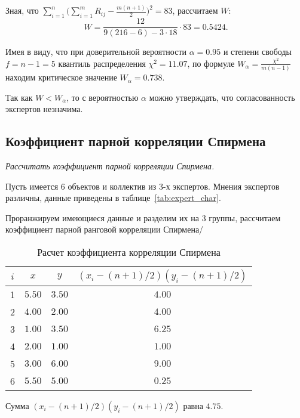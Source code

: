 Зная, что $\sum_{i=1}^n\bigg(\sum^m_{i=1}R_{ij} - \frac{m(n+1)}{2}\bigg)^2 = 83$, рассчитаем $W$:
\[
	W = \frac{12}{9(216-6)-3 \cdot 18} \cdot 83 = 0.5424.
\]

Имея в виду, что при доверительной вероятности $\alpha=0.95$ и степени свободы $f=n-1=5$ квантиль распределения $\chi^2 = 11.07$, по формуле $W_\alpha=\frac{\chi^2}{m(n-1)}$ находим критическое значение $W_\alpha = 0.738$.

Так как $W<W_\alpha$, то с вероятностью $\alpha$ можно утверждать, что согласованность экспертов незначима.

\subsection{Коэффициент парной корреляции Спирмена}
{
	\itshape
	Рассчитать коэффициент парной корреляции Спирмена.
}

Пусть имеется 6 объектов и коллектив из 3-х экспертов.
Мнения экспертов различны, данные приведены в таблице~\ref{tab:expert_char}.

Проранжируем имеющиеся данные и разделим их на 3 группы, рассчитаем коэффициент парной ранговой корреляции Спирмена/

\begin{table}[H]
	\caption{Расчет коэффициента корреляции Спирмена}
	\label{tab:expert_spir1}
	\begin{tabular}{|c|c|c|c|}
		\hline
		$i$ & $x$    & $y$    & $(x_i-(n+1)/2)(y_i-(n+1)/2)$ \\ \hline
		1   & $5.50$ & $3.50$ & $4.00$                       \\ \hline
		2   & $4.00$ & $2.00$ & $4.00$                       \\ \hline
		3   & $1.00$ & $3.50$ & $6.25$                       \\ \hline
		4   & $2.00$ & $1.00$ & $1.00$                       \\ \hline
		5   & $3.00$ & $6.00$ & $9.00$                       \\ \hline
		6   & $5.50$ & $5.00$ & $0.25$                       \\ \hline
	\end{tabular}
\end{table}

Сумма $(x_i-(n+1)/2)(y_i-(n+1)/2)$ равна $4.75$.

